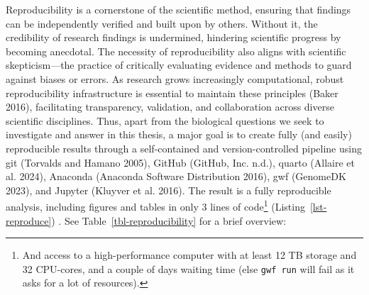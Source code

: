 \documentclass[
  11pt,
  a4paper,
]{scrbook}
\begin{document}
Reproducibility is a cornerstone of the scientific method, ensuring that
findings can be independently verified and built upon by others. Without
it, the credibility of research findings is undermined, hindering
scientific progress by becoming anecdotal. The necessity of
reproducibility also aligns with scientific skepticism---the practice of
critically evaluating evidence and methods to guard against biases or
errors. As research grows increasingly computational, robust
reproducibility infrastructure is essential to maintain these principles
(Baker 2016), facilitating transparency, validation, and collaboration
across diverse scientific disciplines. Thus, apart from the biological
questions we seek to investigate and answer in this thesis, a major goal
is to create fully (and easily) reproducible results through a
self-contained and version-controlled pipeline using git (Torvalds and
Hamano 2005), GitHub (GitHub, Inc. n.d.), quarto (Allaire et al. 2024),
Anaconda (Anaconda Software Distribution 2016), gwf (GenomeDK 2023), and
Jupyter ({Kluyver et al.} 2016). The result is a fully reproducible
analysis, including figures and tables in only 3 lines of
code\footnote{And access to a high-performance computer with at least 12
  TB storage and 32 CPU-cores, and a couple of days waiting time (else
  \texttt{gwf\ run} will fail as it asks for a lot of resources).}
(Listing~\ref{lst-reproduce}) . See Table~\ref{tbl-reproducibility} for
a brief overview:
\end{document}
